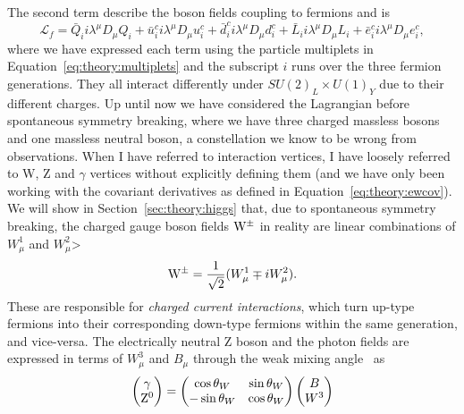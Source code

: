 The second term describe the boson fields coupling to fermions and is
\begin{equation}
  \label{eq:theory:gauge}
   \mathcal{L}_{f} = \bar{Q}_ii\lambda^{\mu}D_{\mu} Q_i + \bar{u}_i^ci\lambda^{\mu}D_{\mu} u_i^c
                   + \bar{d}_i^ci\lambda^{\mu}D_{\mu} d_i^c + \bar{L}_ii\lambda^{\mu}D_{\mu} L_i +  
                     \bar{e}_i^ci\lambda^{\mu}D_{\mu} e^c_i,
\end{equation}
where we have expressed each term using the particle multiplets in Equation~\ref{eq:theory:multiplets} and the subscript $i$ runs over the three fermion generations. They all interact differently under $SU(2)_L \times U(1)_Y$ due to their different charges.\newline
Up until now we have considered the Lagrangian before spontaneous symmetry breaking, where we have three charged massless bosons and one massless neutral boson, a constellation we know to be wrong from observations. When I have referred to interaction vertices, I have loosely referred to W, Z and $\gamma$ vertices without explicitly defining them (and we have only been working with the covariant derivatives as defined in Equation~\ref{eq:theory:ewcov}). We will show in Section~\ref{sec:theory:higgs} that, due to spontaneous symmetry breaking, the charged gauge boson fields $\mathrm{W}^{\pm}$ in reality are linear combinations of $W_{\mu}^1$ and $W_{\mu}^2$>
\begin{equation}
\mathrm{W}^{\pm} = \frac{1}{\sqrt{2}}(W_{\mu}^1 \mp iW_{\mu}^2).
\end{equation}
These are responsible for \emph{charged current interactions}, which turn up-type fermions into their corresponding down-type fermions within the same generation, and vice-versa. The electrically neutral Z boson and the photon fields are expressed in terms of $W_{\mu}^3$ and $B_{\mu}$ through the weak mixing angle~\cite{Weinberg:1979pi} as
\begin{equation}
\begin{pmatrix} \gamma \\ \mathrm{Z}^0 \end{pmatrix}
  = \begin{pmatrix} \cos \theta_W & \sin \theta_W \\
                   -\sin \theta_W & \cos \theta_W \end{pmatrix}
  \begin{pmatrix} B \\ W^3 \end{pmatrix}                   
\end{equation}

